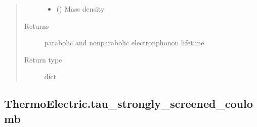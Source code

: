 \documentclass[letterpaper,10pt,english]{sphinxmanual}
\begin{document}
\begin{fulllineitems}
\begin{quote}
\begin{description}
\begin{itemize}
\item {} 
\sphinxAtStartPar
{} () \textendash{} Mass density

\end{itemize}

\item[{Returns}] \leavevmode
\sphinxAtStartPar
{} \textendash{} parabolic and non\sphinxhyphen{}parabolic electron\sphinxhyphen{}phonon lifetime

\item[{Return type}] \leavevmode
\sphinxAtStartPar
dict

\end{description}\end{quote}

\end{fulllineitems}



\subsection{ThermoElectric.tau\_strongly\_screened\_coulomb}
\label{\detokenize{autosummary/ThermoElectric.tau_strongly_screened_coulomb:thermoelectric-tau-strongly-screened-coulomb}}\label{\detokenize{autosummary/ThermoElectric.tau_strongly_screened_coulomb::doc}}
\end{document}
